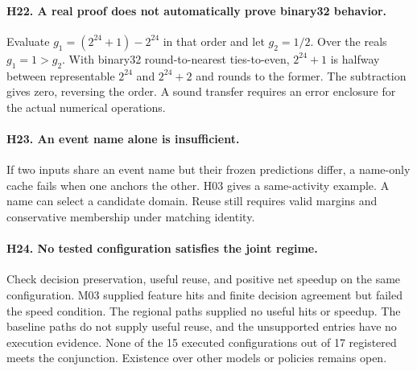 \paragraph{H22. A real proof does not automatically prove binary32 behavior.}
Evaluate $g_1=(2^{24}+1)-2^{24}$ in that order and let $g_2=1/2$. Over the reals $g_1=1>g_2$. With binary32 round-to-nearest ties-to-even, $2^{24}+1$ is halfway between representable $2^{24}$ and $2^{24}+2$ and rounds to the former. The subtraction gives zero, reversing the order. A sound transfer requires an error enclosure for the actual numerical operations.

\paragraph{H23. An event name alone is insufficient.}
If two inputs share an event name but their frozen predictions differ, a name-only cache fails when one anchors the other. H03 gives a same-activity example. A name can select a candidate domain. Reuse still requires valid margins and conservative membership under matching identity.

\paragraph{H24. No tested configuration satisfies the joint regime.}
Check decision preservation, useful reuse, and positive net speedup on the same configuration. M03 supplied feature hits and finite decision agreement but failed the speed condition. The regional paths supplied no useful hits or speedup. The baseline paths do not supply useful reuse, and the unsupported entries have no execution evidence. None of the 15 executed configurations out of 17 registered meets the conjunction. Existence over other models or policies remains open.
